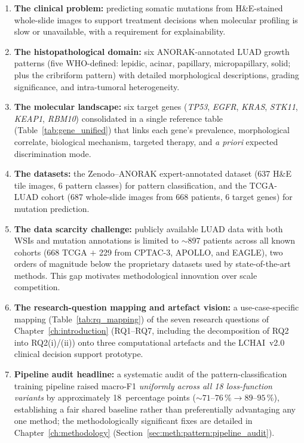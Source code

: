 \begin{enumerate}
    \item \textbf{The clinical problem:} predicting somatic mutations
    from H\&E-stained whole-slide images to support treatment decisions
    when molecular profiling is slow or unavailable, with a requirement
    for explainability.

    \item \textbf{The histopathological domain:} six ANORAK-annotated
    LUAD growth patterns (five WHO-defined: lepidic, acinar, papillary,
    micropapillary, solid; plus the cribriform pattern) with detailed
    morphological descriptions, grading significance, and intra-tumoral
    heterogeneity.

    \item \textbf{The molecular landscape:} six target genes
    (\textit{TP53}, \textit{EGFR}, \textit{KRAS}, \textit{STK11},
    \textit{KEAP1}, \textit{RBM10}) consolidated in a single reference
    table (Table~\ref{tab:gene_unified}) that links each gene's
    prevalence, morphological correlate, biological mechanism, targeted
    therapy, and \emph{a priori} expected discrimination mode.

    \item \textbf{The datasets:} the Zenodo--ANORAK expert-annotated
    dataset (637 H\&E tile images, 6 pattern classes) for pattern
    classification, and the TCGA-LUAD cohort (687 whole-slide images
    from 668 patients, 6 target genes) for mutation prediction.

    \item \textbf{The data scarcity challenge:} publicly available LUAD
    data with both WSIs and mutation annotations is limited to
    $\sim$897 patients across all known cohorts (668 TCGA $+$ 229 from
    CPTAC-3, APOLLO, and EAGLE), two orders of magnitude below the
    proprietary datasets used by state-of-the-art methods.
    This gap motivates methodological innovation over scale competition.

    \item \textbf{The research-question mapping and artefact vision:}
    a use-case-specific mapping (Table~\ref{tab:rq_mapping}) of the
    seven research questions of
    Chapter~\ref{ch:introduction} (RQ1--RQ7, including the
    decomposition of RQ2 into RQ2(i)/(ii)) onto three computational
    artefacts and the LCHAI~v2.0 clinical decision support prototype.

    \item \textbf{Pipeline audit headline:} a systematic audit of the
    pattern-classification training pipeline raised macro-F1
    \emph{uniformly across all 18 loss-function variants} by
    approximately 18~percentage points
    ($\sim 71$--$76\,\% \to 89$--$95\,\%$),
    establishing a fair shared baseline rather than preferentially
    advantaging any one method;
    the methodologically significant fixes are detailed in
    Chapter~\ref{ch:methodology}
    (Section~\ref{sec:meth:pattern:pipeline_audit}).


\end{enumerate}
